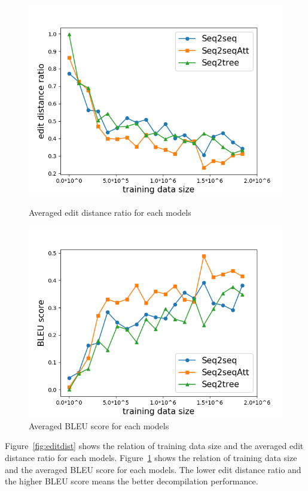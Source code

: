 \documentclass[senior,final,11pt]{iscs-thesis}
\begin{document}
\begin{figure}[]
	\includegraphics[width=12cm]{edit_dist.png}
	\caption{Averaged edit distance ratio for each models}
	\label{fig:editdist}
	\includegraphics[width=12cm]{bleu.png}
	\caption{Averaged BLEU score for each models}
	\label{fig:bleu}
\end{figure}

Figure~\ref{fig:editdist} shows the relation of training data size and the averaged edit distance ratio for each models.
Figure~\ref{fig:bleu} shows the relation of training data size and the averaged BLEU score for each models.
The lower edit distance ratio and the higher BLEU score means the better decompilation performance.
\end{document}
